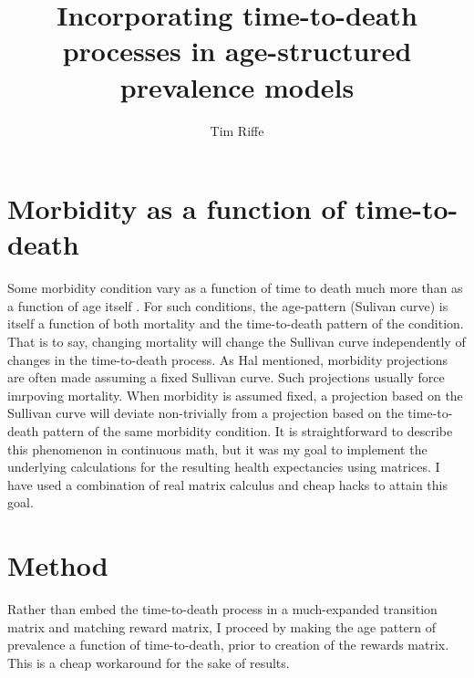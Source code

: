 \documentclass[11pt,oneside,a4paper]{article} %
\begin{document}
\title{Incorporating time-to-death processes in age-structured prevalence
models}

\author[1]{Tim Riffe}


\maketitle


\section{Morbidity as a function of time-to-death}
 
 Some morbidity condition vary as a function of time to death much more than as
 a function of age itself \citep{riffe2015ttd}. For such conditions, the
 age-pattern (Sulivan curve) is itself a function of both mortality and the
 time-to-death pattern of the condition. That is to say, changing mortality will
 change the Sullivan curve independently of changes in the time-to-death
 process. As Hal mentioned, morbidity projections are often made assuming a
 fixed Sullivan curve. Such projections usually force imrpoving mortality. When
 morbidity is assumed fixed, a projection based on the Sullivan curve will
 deviate non-trivially from a projection based on the time-to-death pattern of
 the same morbidity condition. It is straightforward to describe this phenomenon
 in continuous math, but it was my goal to implement the underlying calculations
 for the resulting health expectancies using matrices. I have used a combination
 of real matrix calculus and cheap hacks to attain this goal.
 
 \section{Method}
 
 Rather than embed the time-to-death process in a much-expanded transition
 matrix and matching reward matrix, I proceed by making the age pattern of
 prevalence a function of time-to-death, prior to creation of the rewards
 matrix. This is a cheap workaround for the sake of results.
 
\end{document}
